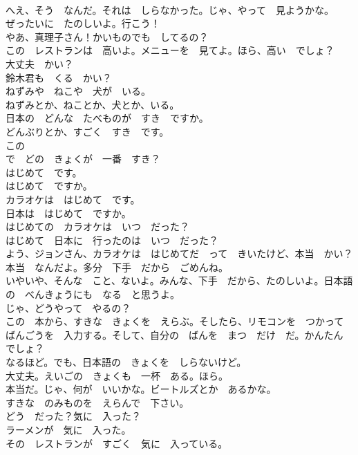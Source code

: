 \documentclass[8pt]{extreport}
\begin{document}
\begin{CJK}{UTF8}{min}
\\	へえ、そう　なんだ。それは　しらなかった。じゃ、やって　見ようかな。	
\\	ぜったいに　たのしいよ。行こう！	
\\	やあ、真理子さん！かいものでも　してるの？	
\\	この　レストランは　高いよ。メニューを　見てよ。ほら、高い　でしょ？	
\\	大丈夫　かい？	
\\	鈴木君も　くる　かい？	
\\	ねずみや　ねこや　犬が　いる。	
\\	ねずみとか、ねことか、犬とか、いる。	
\\	日本の　どんな　たべものが　すき　ですか。	
\\	どんぶりとか、すごく　すき　です。	
\\	この　
\\	で　どの　きょくが　一番　すき？	
\\	はじめて　です。	
\\	はじめて　ですか。	
\\	カラオケは　はじめて　です。	
\\	日本は　はじめて　ですか。	
\\	はじめての　カラオケは　いつ　だった？	
\\	はじめて　日本に　行ったのは　いつ　だった？	
\\	よう、ジョンさん、カラオケは　はじめてだ　って　きいたけど、本当　かい？	
\\	本当　なんだよ。多分　下手　だから　ごめんね。	
\\	いやいや、そんな　こと、ないよ。みんな、下手　だから、たのしいよ。日本語の　べんきょうにも　なる　と思うよ。	
\\	じゃ、どうやって　やるの？	
\\	この　本から、すきな　きょくを　えらぶ。そしたら、リモコンを　つかって　ばんごうを　入力する。そして、自分の　ばんを　まつ　だけ　だ。かんたん　でしょ？	
\\	なるほど。でも、日本語の　きょくを　しらないけど。	
\\	大丈夫。えいごの　きょくも　一杯　ある。ほら。	
\\	本当だ。じゃ、何が　いいかな。ビートルズとか　あるかな。	
\\	すきな　のみものを　えらんで　下さい。	
\\	どう　だった？気に　入った？	
\\	ラーメンが　気に　入った。	
\\	その　レストランが　すごく　気に　入っている。	

\end{CJK}
\end{document}
